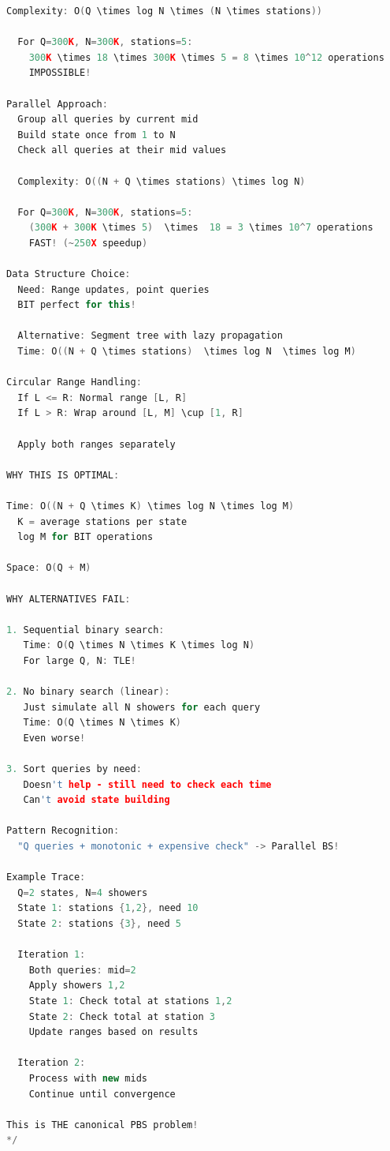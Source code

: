 \documentclass[11pt,a4paper,oneside]{book}
\begin{document}
\begin{lstlisting}[language=C++, caption=Complete METEORS Solution - THE Classic PBS Problem]
  Complexity: O(Q \times log N \times (N \times stations))
  
  For Q=300K, N=300K, stations=5:
    300K \times 18 \times 300K \times 5 = 8 \times 10^12 operations
    IMPOSSIBLE!

Parallel Approach:
  Group all queries by current mid
  Build state once from 1 to N
  Check all queries at their mid values
  
  Complexity: O((N + Q \times stations) \times log N)
  
  For Q=300K, N=300K, stations=5:
    (300K + 300K \times 5)  \times  18 = 3 \times 10^7 operations
    FAST! (~250X speedup)

Data Structure Choice:
  Need: Range updates, point queries
  BIT perfect for this!
  
  Alternative: Segment tree with lazy propagation
  Time: O((N + Q \times stations)  \times log N  \times log M)

Circular Range Handling:
  If L <= R: Normal range [L, R]
  If L > R: Wrap around [L, M] \cup [1, R]
  
  Apply both ranges separately

WHY THIS IS OPTIMAL:

Time: O((N + Q \times K) \times log N \times log M)
  K = average stations per state
  log M for BIT operations

Space: O(Q + M)

WHY ALTERNATIVES FAIL:

1. Sequential binary search:
   Time: O(Q \times N \times K \times log N)
   For large Q, N: TLE!

2. No binary search (linear):
   Just simulate all N showers for each query
   Time: O(Q \times N \times K)
   Even worse!

3. Sort queries by need:
   Doesn't help - still need to check each time
   Can't avoid state building

Pattern Recognition:
  "Q queries + monotonic + expensive check" -> Parallel BS!

Example Trace:
  Q=2 states, N=4 showers
  State 1: stations {1,2}, need 10
  State 2: stations {3}, need 5
  
  Iteration 1:
    Both queries: mid=2
    Apply showers 1,2
    State 1: Check total at stations 1,2
    State 2: Check total at station 3
    Update ranges based on results
  
  Iteration 2:
    Process with new mids
    Continue until convergence

This is THE canonical PBS problem!
*/
\end{lstlisting}
\end{document}
